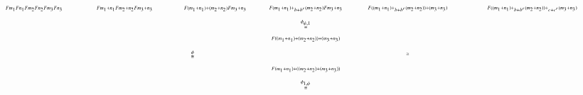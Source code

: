 \documentclass[reqno]{amsart}
\begin{document}
\[
\hspace{-1in}
\begin{tikzpicture}[scale=1.6]
\node (A) at (1.5,3) {$\scriptscriptstyle{Fm_1 Fn_1 Fm_2 Fn_2 Fm_3 Fn_3}$};
\node (A') at (3.5,3) {$\scriptscriptstyle{Fm_1+n_1 Fm_2+n_2 Fm_3+n_3}$};
\node (A'') at (5.5,3) {$\scriptscriptstyle{F(m_1+n_1)+(m_2+n_2) Fm_3+n_3}$};
\node (A''') at (7.5,3) {$\scriptscriptstyle{F(m_1+n_1)+_{b+b'}(m_2+n_2) Fm_3+n_3}$};
\node (A'''') at (9.75,3) {$\scriptscriptstyle{F((m_1+n_1)+_{b+b'}(m_2+n_2))+(m_3+n_3)}$};
\node (A''''') at (12.5,3) {$\scriptscriptstyle{F((m_1+n_1)+_{b+b'}(m_2+n_2))+_{c+c'}(m_3+n_3)}$};

\node (Z) at (7.5,2.33) {$\scriptscriptstyle{F((m_1+n_1)+(m_2+n_2))+(m_3+n_3)}$};
\node (Z') at (7.5,1.66) {$\scriptscriptstyle{F(m_1+n_1)+((m_2+n_2)+(m_3+n_3))}$};
\node (1'') at (5,2) {$\scriptscriptstyle{\stackrel{\phi} \cong}$};
\node (2'') at (7.5,2.66) {$\scriptscriptstyle{\stackrel{\phi_{\psi,1}} \cong}$};
\node (3'') at (7.5,1.33) {$\scriptscriptstyle{\stackrel{\phi_{1,\psi}} \cong}$};
\node (4'') at (9.75,2) {$\scriptscriptstyle{\cong}$};


\end{tikzpicture}\]
\end{document}
